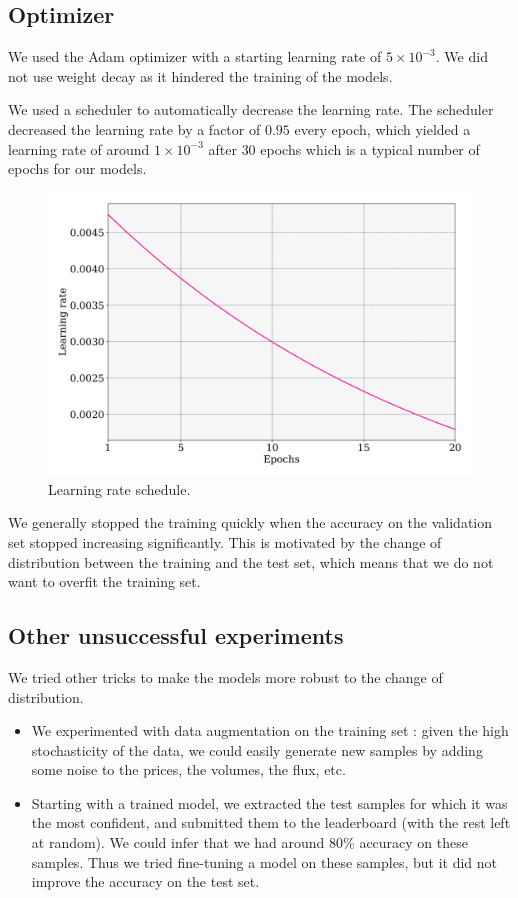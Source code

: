 \documentclass[switch, 11pt]{article}
\begin{document}
\begin{multicols}{2}
    \subsection{Optimizer}

    We used the Adam optimizer with a starting learning rate of $5\times10^{-3}$. We did not use weight decay as it hindered the training of the models.

    We used a scheduler to automatically decrease the learning rate. The scheduler decreased the learning rate by a factor of $0.95$ every epoch, which yielded a learning rate of around $1\times10^{-3}$ after $30$ epochs which is a typical number of epochs for our models.

    \begin{figure}[H]
        \centering
        \includegraphics[width=\columnwidth]{figures/learning_rate.png}
        \caption{Learning rate schedule.}
        \label{fig:learning_rate}
    \end{figure}

    We generally stopped the training quickly when the accuracy on the validation set stopped increasing significantly. This is motivated by the change of distribution between the training and the test set, which means that we do not want to overfit the training set.

    \subsection{Other unsuccessful experiments}

    We tried other tricks to make the models more robust to the change of distribution.
    \begin{itemize}
        \item We experimented with data augmentation on the training set : given the high stochasticity of the data, we could easily generate new samples by adding some noise to the prices, the volumes, the flux, etc.
        \item Starting with a trained model, we extracted the test samples for which it was the most confident, and submitted them to the leaderboard (with the rest left at random). We could infer that we had around $80\%$ accuracy on these samples. Thus we tried fine-tuning a model on these samples, but it did not improve the accuracy on the test set.
    \end{itemize}


\end{multicols}
\end{document}
